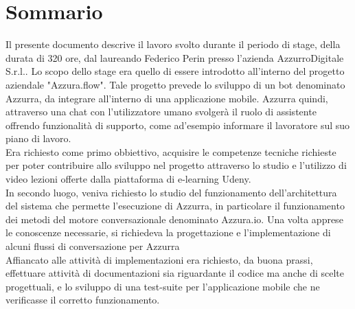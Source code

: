 
\cleardoublepage
{}
{}
\begingroup
\let\clearpage\relax
\let\cleardoublepage\relax
\let\cleardoublepage\relax

\chapter*{Sommario}

Il presente documento descrive il lavoro svolto durante il periodo di stage, della durata di 320 ore, dal laureando Federico Perin presso l'azienda AzzurroDigitale S.r.l..
Lo scopo dello stage era quello di essere introdotto all'interno del progetto aziendale "Azzura.flow". Tale progetto prevede lo sviluppo di un bot denominato Azzurra, da integrare all'interno di una applicazione mobile. Azzurra quindi, attraverso una chat con l'utilizzatore umano svolgerà il ruolo di assistente offrendo funzionalità di supporto, come ad'esempio informare il lavoratore sul suo piano di lavoro. \\
 Era richiesto come primo obbiettivo, acquisire le competenze tecniche richieste per poter contribuire allo sviluppo nel progetto attraverso lo studio e l'utilizzo di video lezioni offerte dalla piattaforma di e-learning Udeny.\\
  In secondo luogo, veniva richiesto lo studio del funzionamento dell'architettura del sistema che permette l'esecuzione di Azzurra, in particolare il funzionamento dei metodi del motore conversazionale denominato Azzura.io. Una volta apprese le conoscenze necessarie, si richiedeva la progettazione e l'implementazione di alcuni flussi di conversazione per Azzurra \\
   Affiancato alle attività di implementazioni era richiesto, da buona prassi, effettuare attività di documentazioni sia riguardante il codice ma anche di scelte progettuali, e lo sviluppo di una test-suite per l'applicazione mobile che ne verificasse il corretto funzionamento.




%
%

\endgroup			

\vfill

